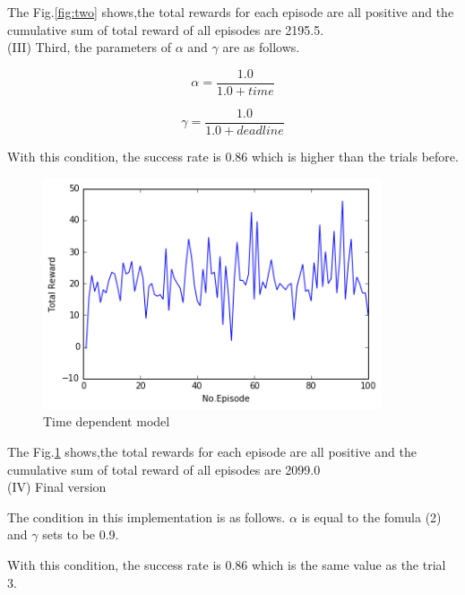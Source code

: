 \documentclass[a4paper,11pt]{article}
\begin{document}
The Fig.\ref{fig:two} shows,the total rewards for each episode are all positive and the cumulative sum of total reward of all episodes are 2195.5.
\\


(I\hspace{-.1em}I\hspace{-.1em}I) Third, the parameters of $\alpha$ and $\gamma$ are as follows.

\begin{equation}
	\alpha=\frac{1.0}{1.0+time}
\end{equation}

\begin{equation}
	\gamma=\frac{1.0}{1.0+deadline}
\end{equation}

With this condition, the success rate is 0.86 which is higher than the trials before.


\begin{figure}[H]
\begin{center}
\includegraphics[width=100mm]{graph/better.jpg}
\end{center}
\caption{Time dependent model}
\label{fig:three}
\end{figure}

The Fig.\ref{fig:three} shows,the total rewards for each episode are all positive and the cumulative sum of total reward of all episodes are 2099.0
\\

(I\hspace{-.1em}V) Final version

The condition in this implementation is as follows.
$\alpha$ is equal to the fomula (2) and $\gamma$ sets to be 0.9.

With this condition, the success rate is 0.86 which is the same value as the trial 3.
\end{document}
